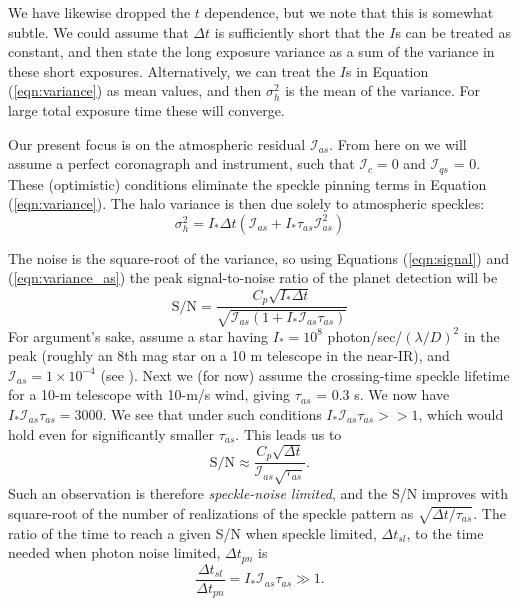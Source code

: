 \documentclass[10pt,preprint]{aastex631}
\begin{document}
We have likewise dropped the $t$ dependence, but we note that this is somewhat subtle.  We could assume that $\Delta t$ is sufficiently short that the $I$s can be treated as constant, and then state the long exposure variance as a sum of the variance in these short exposures.  Alternatively, we can treat the $I$s in Equation (\ref{eqn:variance}) as mean values, and then $\sigma^2_{h}$ is the mean of the variance.  For large total exposure time these will converge.

Our present focus is on the atmospheric residual $\mathcal{I}_{as}$.  From here on we will assume a perfect coronagraph and instrument, such that $\mathcal{I}_c = 0$ and $\mathcal{I}_{qs}$ = 0.  These (optimistic) conditions eliminate the speckle pinning \citep{2001ApJ...558L..71B} terms in Equation (\ref{eqn:variance}).  The halo variance is then due solely to atmospheric speckles:
\begin{equation}
\sigma^2_{h}  = I_* \Delta t \left(\mathcal{I}_{as} + I_* \tau_{as} \mathcal{I}_{as}^2 \right)
\label{eqn:variance_as}
\end{equation}

The noise is the square-root of the variance, so using Equations (\ref{eqn:signal}) and  (\ref{eqn:variance_as}) the peak signal-to-noise ratio of the planet detection will be
\begin{equation}
\mbox{S/N} = \frac{C_p \sqrt{I_* \Delta t}}{ \sqrt{\mathcal{I}_{as} (1 + I_*\mathcal{I}_{as} \tau_{as})}} 
\end{equation}
For argument's sake, assume a star having $I_* = 10^8$ photon/sec/$(\lambda/D)^2$ in the peak (roughly an 8th mag star on a 10 m telescope in the near-IR), and $\mathcal{I}_{as} = 1\times10^{-4}$ (see \citealt{2018JATIS...4a9001M}).  Next we (for now) assume the \citet{2005SPIE.5903..170M} crossing-time speckle lifetime for a 10-m telescope with 10-m/s wind, giving $\tau_{as}$ = 0.3 s.  We now have $I_*\mathcal{I}_{as} \tau_{as} = 3000$.  We see that under such conditions  $I_*\mathcal{I}_{as} \tau_{as} >> 1$, which would hold even for significantly smaller $\tau_{as}$.  This leads us to
\begin{equation}
\mbox{S/N} \approx \frac{C_p \sqrt{\Delta t}}{ \mathcal{I}_{as} \sqrt{\tau_{as}}}. 
\end{equation}
Such an observation is therefore \emph{speckle-noise limited}, and the S/N improves with square-root of the number of realizations of the speckle pattern as $\sqrt{\Delta t/ \tau_{as}}$.  The ratio of the time to reach a given S/N when speckle limited, $\Delta t_{sl}$, to the time needed when photon noise limited, $\Delta t_{pn}$ is
\begin{equation}
\frac{\Delta t_{sl}}{\Delta t_{pn}} = I_*\mathcal{I}_{as} \tau_{as} \gg 1.
\label{eqn:relexptime}
\end{equation}
\end{document}

